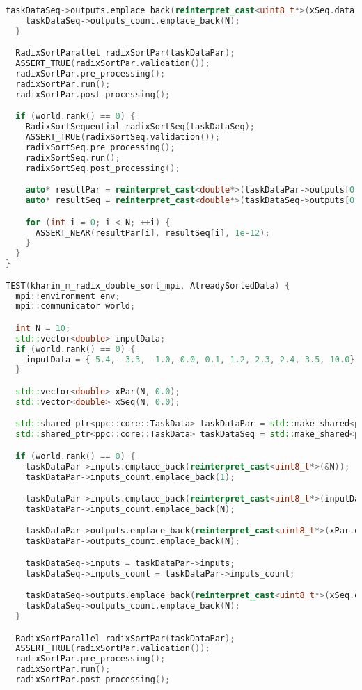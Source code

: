 \documentclass[a4paper,12pt]{article}
\begin{document}
\begin{lstlisting}[language=C++, caption={Тесты}]
    taskDataSeq->outputs.emplace_back(reinterpret_cast<uint8_t*>(xSeq.data()));
    taskDataSeq->outputs_count.emplace_back(N);
  }

  RadixSortParallel radixSortPar(taskDataPar);
  ASSERT_TRUE(radixSortPar.validation());
  radixSortPar.pre_processing();
  radixSortPar.run();
  radixSortPar.post_processing();

  if (world.rank() == 0) {
    RadixSortSequential radixSortSeq(taskDataSeq);
    ASSERT_TRUE(radixSortSeq.validation());
    radixSortSeq.pre_processing();
    radixSortSeq.run();
    radixSortSeq.post_processing();

    auto* resultPar = reinterpret_cast<double*>(taskDataPar->outputs[0]);
    auto* resultSeq = reinterpret_cast<double*>(taskDataSeq->outputs[0]);

    for (int i = 0; i < N; ++i) {
      ASSERT_NEAR(resultPar[i], resultSeq[i], 1e-12);
    }
  }
}

TEST(kharin_m_radix_double_sort_mpi, AlreadySortedData) {
  mpi::environment env;
  mpi::communicator world;

  int N = 10;
  std::vector<double> inputData;
  if (world.rank() == 0) {
    inputData = {-5.4, -3.3, -1.0, 0.0, 0.1, 1.2, 2.3, 2.4, 3.5, 10.0};
  }

  std::vector<double> xPar(N, 0.0);
  std::vector<double> xSeq(N, 0.0);

  std::shared_ptr<ppc::core::TaskData> taskDataPar = std::make_shared<ppc::core::TaskData>();
  std::shared_ptr<ppc::core::TaskData> taskDataSeq = std::make_shared<ppc::core::TaskData>();

  if (world.rank() == 0) {
    taskDataPar->inputs.emplace_back(reinterpret_cast<uint8_t*>(&N));
    taskDataPar->inputs_count.emplace_back(1);

    taskDataPar->inputs.emplace_back(reinterpret_cast<uint8_t*>(inputData.data()));
    taskDataPar->inputs_count.emplace_back(N);

    taskDataPar->outputs.emplace_back(reinterpret_cast<uint8_t*>(xPar.data()));
    taskDataPar->outputs_count.emplace_back(N);

    taskDataSeq->inputs = taskDataPar->inputs;
    taskDataSeq->inputs_count = taskDataPar->inputs_count;

    taskDataSeq->outputs.emplace_back(reinterpret_cast<uint8_t*>(xSeq.data()));
    taskDataSeq->outputs_count.emplace_back(N);
  }

  RadixSortParallel radixSortPar(taskDataPar);
  ASSERT_TRUE(radixSortPar.validation());
  radixSortPar.pre_processing();
  radixSortPar.run();
  radixSortPar.post_processing();


\end{lstlisting}
\end{document}
